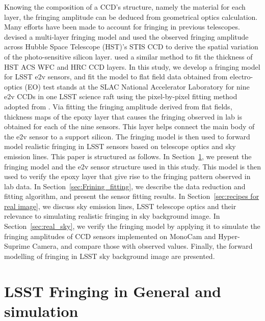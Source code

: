 \documentclass[twocolumn]{aastex63} %
\begin{document}
\begin{CJK*}{UTF8}{gbsn}
Knowing the composition of a CCD's structure, namely the material for each layer, the fringing amplitude can be deduced from geometrical optics calculation. Many efforts have been made to account for fringing in previous telescopes. \citet{Malumuth03} devised a multi-layer fringing model and used the observed fringing amplitude across Hubble Space Telescope (HST)'s STIS CCD to derive the spatial variation of the photo-sensitive silicon layer. \citet{Walsh03} used a similar method to fit the thickness of HST ACS WFC and HRC CCD layers. In this study, we develop a fringing model for LSST e2v sensors, and fit the model to flat field data obtained from electro-optics (EO) test stands at the SLAC National Accelerator Laboratory for nine e2v CCDs in one LSST science raft using the pixel-by-pixel fitting method adopted from \citet{Malumuth03}. Via fitting the fringing amplitude derived from flat fields, thickness maps of the epoxy layer that causes the fringing observed in lab is obtained for each of the nine sensors. This layer helps connect the main body of the e2v sensor to a support silicon. The fringing model is then used to forward model realistic fringing in LSST sensors based on telescope optics and sky emission lines. This paper is structured as follows. In Section~\ref{sec: LSST_fringe_general}, we present the fringing model and the e2v sensor structure used in this study.  This model is then used to verify the epoxy layer that give rise to the fringing pattern observed in lab data. In Section~\ref{sec:Frining_fitting}, we describe the data reduction and fitting algorithm, and present the sensor fitting results. In Section~\ref{sec:recipes for real image}, we discuss sky emission lines, LSST telescope optics and their relevance to  simulating realistic fringing in sky background image. In Section~\ref{sec:real_sky}, we verify the fringing model by applying it to simulate the fringing amplitudes of CCD sensors  implemented on MonoCam and Hyper-Suprime Camera, and compare those with observed values. Finally, the forward modelling of fringing in LSST sky background image are presented. 

 
\section{LSST Fringing in General and simulation} \label{sec: LSST_fringe_general}


\end{CJK*}
\end{document}
